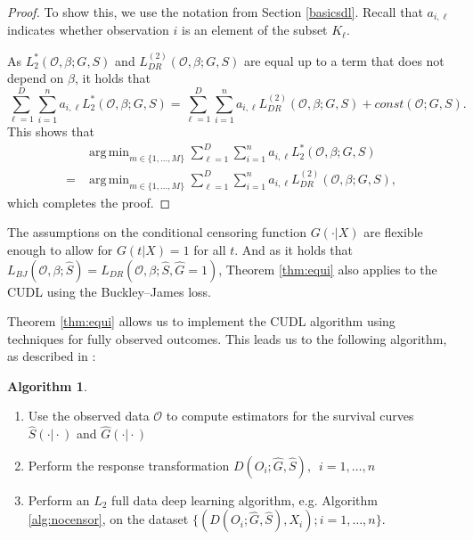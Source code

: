 \documentclass[12pt, a4paper]{scrartcl}
\theoremstyle{definition}
\newtheorem{Algorithm}{Algorithm}[section]
\theoremstyle{plain}
\numberwithin{equation}{section}
\numberwithin{figure}{section}
\numberwithin{table}{section}
\DeclareMathOperator*{\argmin}{arg\,min}
\begin{document}
\begin{proof}
		To show this, we use the notation from Section \ref{basicsdl}.
		Recall that $a_{i,\ell}$ indicates whether observation $i$ is an element of the subset $K_\ell$.
		
		As $L_2^*(\mathcal{O}, \beta; G,S)$ and $L_{DR}^{(2)}(\mathcal{O}, \beta; G,S)$ are equal up to a term that does not depend on $\beta$, it holds that
		\begin{equation*}
		\sum_{\ell=1}^{D} \sum_{i=1}^{n} a_{i,\ell} L_2^*(\mathcal{O}, \beta; G,S) = \sum_{\ell=1}^{D} \sum_{i=1}^{n} a_{i,\ell} L_{DR}^{(2)}(\mathcal{O}, \beta; G,S) + const(\mathcal{O}; G,S).
		\end{equation*}
		This shows that
		\begin{equation*}
		\begin{split}
		 &\argmin_{m \in \{1,\dots, M\}}\sum_{\ell=1}^{D} \sum_{i=1}^{n} a_{i,\ell} L_2^*(\mathcal{O}, \beta; G,S)\\
		  ={} &\argmin_{m \in \{1,\dots, M\}}\sum_{\ell=1}^{D} \sum_{i=1}^{n} a_{i,\ell} L_{DR}^{(2)}(\mathcal{O}, \beta; G,S),
		 \end{split}
		\end{equation*}
		which completes the proof.
	\end{proof}

	The assumptions on the conditional censoring function $G(\cdot\vert X)$ are flexible enough to allow for $G(t\vert X)=1$ for all $t$.
	And as it holds that $L_{BJ}(\mathcal{O}, \beta; \hat{S})=L_{DR}(\mathcal{O}, \beta; \hat{S}, \hat{G} = 1)$, Theorem \ref{thm:equi} also applies to the CUDL using the Buckley--James loss.
	
	Theorem \ref{thm:equi} allows us to implement the CUDL algorithm using techniques for fully observed outcomes.
	This leads us to the following algorithm, as described in \citet*{basearticle}:
	\begin{Algorithm}\label{alg:censor}~
		\begin{enumerate}
			\item Use the observed data $\mathcal{O}$ to compute estimators for the survival curves $\hat{S}(\cdot\vert\cdot)$ and $\hat{G}(\cdot\vert\cdot)$
			\item Perform the response transformation $D(O_i; \hat{G},\hat{S}),$~$ i = 1,\dots,n$
			\item Perform an $L_2$ full data deep learning algorithm, e.g. Algorithm \ref{alg:nocensor}, on the dataset $\{(D(O_i; \hat{G},\hat{S}), X_i); i = 1,\dots,n\}$.
		\end{enumerate}
	\end{Algorithm}
\end{document}
